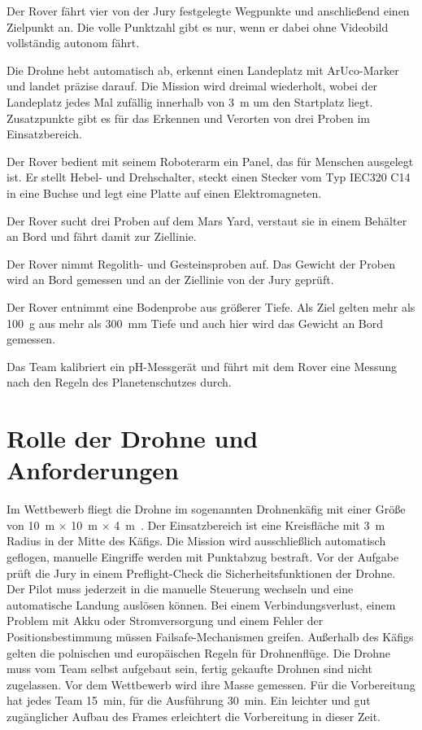 \begin{description}[style=nextline]
    \item[Traverse Sub-Task] Der Rover fährt vier von der Jury festgelegte Wegpunkte und anschließend einen Zielpunkt an. Die volle Punktzahl gibt es nur, wenn er dabei ohne Videobild vollständig autonom fährt.
    \item[Droning Sub-Task] Die Drohne hebt automatisch ab, erkennt einen Landeplatz mit ArUco-Marker und landet präzise darauf. Die Mission wird dreimal wiederholt, wobei der Landeplatz jedes Mal zufällig innerhalb von \SI{3}{\metre} um den Startplatz liegt. Zusatzpunkte gibt es für das Erkennen und Verorten von drei Proben im Einsatzbereich.
    \item[Maintenance Task] Der Rover bedient mit seinem Roboterarm ein Panel, das für Menschen ausgelegt ist. Er stellt Hebel- und Drehschalter, steckt einen Stecker vom Typ IEC320 C14 in eine Buchse und legt eine Platte auf einen Elektromagneten.
    \item[Probing Task] Der Rover sucht drei Proben auf dem Mars Yard, verstaut sie in einem Behälter an Bord und fährt damit zur Ziellinie.
    \item[Surface Sampling] Der Rover nimmt Regolith- und Gesteinsproben auf. Das Gewicht der Proben wird an Bord gemessen und an der Ziellinie von der Jury geprüft.
    \item[Deep Sampling] Der Rover entnimmt eine Bodenprobe aus größerer Tiefe. Als Ziel gelten mehr als \SI{100}{\gram} aus mehr als \SI{300}{\milli\metre} Tiefe und auch hier wird das Gewicht an Bord gemessen.
    \item[Astro-Bio Sub-Task] Das Team kalibriert ein pH-Messgerät und führt mit dem Rover eine Messung nach den Regeln des Planetenschutzes durch.
\end{description}

\section{Rolle der Drohne und Anforderungen}
\label{sec:Anforderungen}

Im Wettbewerb fliegt die Drohne im sogenannten Drohnenkäfig mit einer Größe von \SI{10}{\metre} $\times$ \SI{10}{\metre} $\times$ \SI{4}{\metre}~\cite{ercRules2026}. Der Einsatzbereich ist eine Kreisfläche mit \SI{3}{\metre} Radius in der Mitte des Käfigs. Die Mission wird ausschließlich automatisch geflogen, manuelle Eingriffe werden mit Punktabzug bestraft. Vor der Aufgabe prüft die Jury in einem Preflight-Check die Sicherheitsfunktionen der Drohne. Der Pilot muss jederzeit in die manuelle Steuerung wechseln und eine automatische Landung auslösen können. Bei einem Verbindungsverlust, einem Problem mit Akku oder Stromversorgung und einem Fehler der Positionsbestimmung müssen Failsafe-Mechanismen greifen. Außerhalb des Käfigs gelten die polnischen und europäischen Regeln für Drohnenflüge. Die Drohne muss vom Team selbst aufgebaut sein, fertig gekaufte Drohnen sind nicht zugelassen. Vor dem Wettbewerb wird ihre Masse gemessen. Für die Vorbereitung hat jedes Team \SI{15}{\minute}, für die Ausführung \SI{30}{\minute}. Ein leichter und gut zugänglicher Aufbau des Frames erleichtert die Vorbereitung in dieser Zeit.

